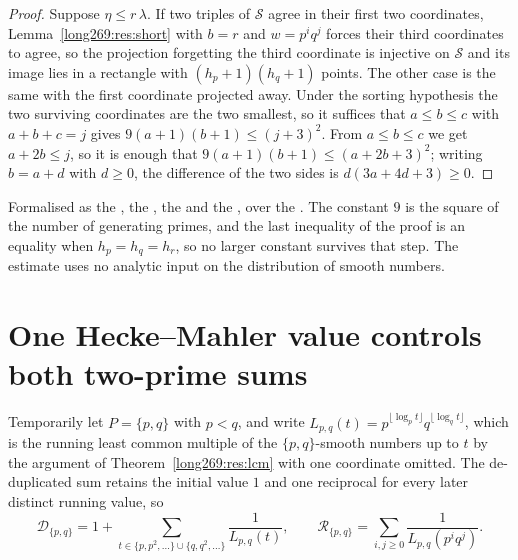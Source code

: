 \documentclass[11pt]{article}
\newcommand{\lo}{\lambda}
\newcommand{\hi}{\eta}
\begin{document}
\begin{proof}
Suppose $\hi\le r\,\lo$.  If two triples of $\mathcal S$ agree in their first
two coordinates, Lemma~\ref{long269:res:short} with $b=r$ and $w=p^{i}q^{j}$ forces
their third coordinates to agree, so the projection forgetting the third
coordinate is injective on $\mathcal S$ and its image lies in a rectangle with
$(h_p+1)(h_q+1)$ points.  The other case is the same with the first coordinate
projected away.  Under the sorting hypothesis the two surviving coordinates are
the two smallest, so it suffices that $a\le b\le c$ with $a+b+c=j$ gives
$9(a+1)(b+1)\le(j+3)^{2}$.  From $a\le b\le c$ we get $a+2b\le j$, so it is
enough that $9(a+1)(b+1)\le(a+2b+3)^{2}$; writing $b=a+d$ with $d\ge0$, the
difference of the two sides is $d(3a+4d+3)\ge0$.
\end{proof}

\noindent Formalised as the
, the
, the
 and the
, over the
.  The constant $9$ is the square of the number of generating
primes, and the last inequality of the proof is an equality when
$h_p=h_q=h_r$, so no larger constant survives that step.  The estimate uses no
analytic input on the distribution of smooth numbers.

\section{One Hecke--Mahler value controls both two-prime sums}
\label{long269:sec:two-prime}

Temporarily let $P=\{p,q\}$ with $p<q$, and write
$L_{p,q}(t)=p^{\lfloor\log_p t\rfloor}q^{\lfloor\log_q t\rfloor}$, which is the
running least common multiple of the $\{p,q\}$-smooth numbers up to $t$ by the
argument of Theorem~\ref{long269:res:lcm} with one coordinate omitted.  The
de-duplicated sum retains the initial value $1$ and one reciprocal for every
later distinct running value, so
\[
 \mathcal D_{\{p,q\}}
 =1+\sum_{t\in\{p,p^2,\ldots\}\cup\{q,q^2,\ldots\}}\frac1{L_{p,q}(t)},
 \qquad
 \mathcal R_{\{p,q\}}=\sum_{i,j\ge0}\frac1{L_{p,q}(p^iq^j)} .
\]
\end{document}
